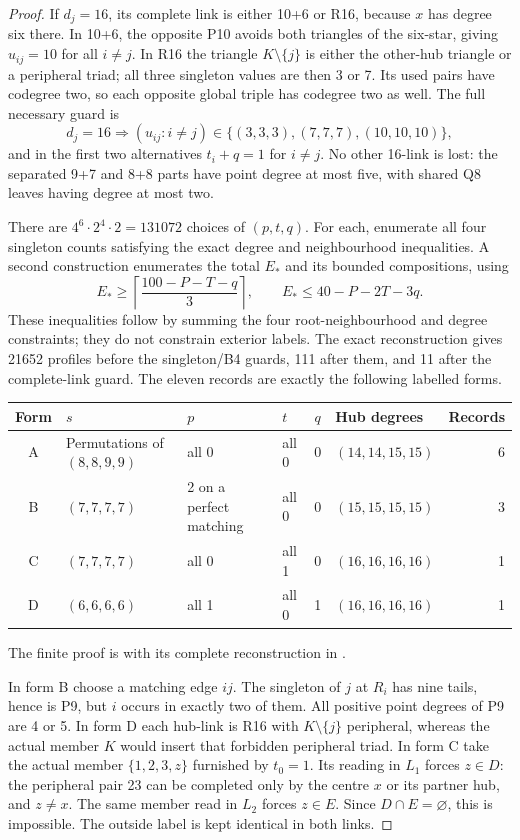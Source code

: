 \documentclass[11pt,a4paper]{article}
\numberwithin{equation}{section}
\theoremstyle{remark}
\begin{document}
\begin{proof}
If $ d_j=16$, its complete link is either 10+6 or R16, because $ x $
has degree six there. In 10+6, the opposite P10 avoids both triangles
of the six-star, giving $ u_{ij}=10$ for all $ i\ne j $. In R16 the
triangle $ K\setminus\{j\}$ is either the other-hub triangle or a
peripheral triad; all three singleton values are then 3 or 7. Its used
pairs have codegree two, so each opposite global triple has codegree
two as well. The full necessary guard is
\[
 d_j=16\Longrightarrow
 (u_{ij}:i\ne j)\in\{(3,3,3),(7,7,7),(10,10,10)\},
\]
and in the first two alternatives $ t_i+q=1$ for $ i\ne j $.
No other 16-link is lost: the separated 9+7 and 8+8 parts have point
degree at most five, with shared Q8 leaves having degree at most two.

There are $4^6\cdot 2^4\cdot 2=131072$ choices of $(p,t,q)$.
For each, enumerate all four singleton counts satisfying the exact
degree and neighbourhood inequalities. A second construction enumerates
the total $ E_*$ and its bounded compositions, using
\[
 E_*\ge\left\lceil\frac{100-P-T-q}{3}\right\rceil,
 \qquad E_*\le 40-P-2T-3q.
\]
These inequalities follow by summing the four root-neighbourhood and
degree constraints; they do not constrain exterior labels. The exact
reconstruction gives 21652 profiles before the singleton/B4 guards,
111 after them, and 11 after the complete-link guard. The eleven
records are exactly the following labelled forms.
\begin{center}\small
\setlength{\tabcolsep}{4pt}
\begin{tabular}{c l l l c l r}\toprule
Form&$ s $&$ p $&$ t $&$ q $&Hub degrees&Records\\\midrule
A&Permutations of $(8,8,9,9)$&all 0&all 0&0&$(14,14,15,15)$&6\\
B&$(7,7,7,7)$&2 on a perfect matching&all 0&0&$(15,15,15,15)$&3\\
C&$(7,7,7,7)$&all 0&all 1&0&$(16,16,16,16)$&1\\
D&$(6,6,6,6)$&all 1&all 0&1&$(16,16,16,16)$&1\\\bottomrule
\end{tabular}
\end{center}
The finite proof is 
with its complete reconstruction in .

In form B choose a matching edge $ ij $. The singleton of $ j $ at $ R_i $
has nine tails, hence is P9, but $ i $ occurs in exactly two of them.
All positive point degrees of P9 are 4 or 5. In form D each hub-link
is R16 with $ K\setminus\{j\}$ peripheral, whereas the actual member $ K $
would insert that forbidden peripheral triad. In form C take the
actual member $\{1,2,3,z\}$ furnished by $ t_0=1$.
Its reading in $ L_1$ forces $ z\in D $: the peripheral pair 23 can be
completed only by the centre $ x $ or its partner hub, and $ z\ne x $.
The same member read in $ L_2$ forces $ z\in E $. Since $ D\cap E=\varnothing $,
this is impossible. The outside label is kept identical in both links.


\end{proof}
\end{document}
